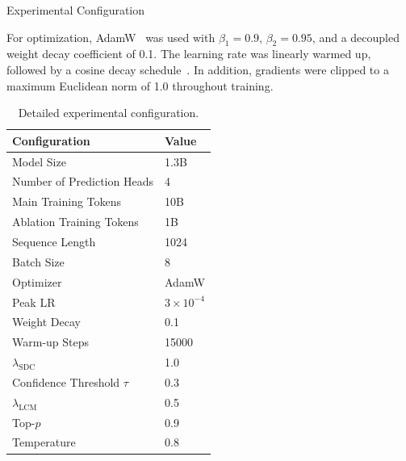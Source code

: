 
\begin{Appx}{Experimental Configuration}\label{app:experimental-config}

For optimization, AdamW~\cite{loshchilov2019adamw} was used with
$\beta_1=0.9$, $\beta_2=0.95$, and a decoupled weight decay coefficient
of 0.1. The learning rate was linearly warmed up, followed by a cosine
decay schedule~\cite{loshchilov2017sgdr}. In addition, gradients were
clipped to a maximum Euclidean norm of 1.0 throughout training.

\begin{table}[htbp]
    \centering
    \caption{Detailed experimental configuration.}
    \label{tab:experimental-config}

    \begin{tabular}{ll}
        \hline
        \textbf{Configuration} & \textbf{Value} \\
        \hline
        Model Size & 1.3B \\
        Number of Prediction Heads & 4 \\
        Main Training Tokens & 10B \\
        Ablation Training Tokens & 1B \\
        Sequence Length & 1024 \\
        Batch Size & 8 \\
        Optimizer & AdamW \\
        Peak LR & $3 \times 10^{-4}$ \\
        Weight Decay & 0.1 \\
        Warm-up Steps & 15000 \\
        $\lambda_{\mathrm{SDC}}$ & 1.0 \\
        Confidence Threshold $\tau$ & 0.3 \\
        $\lambda_{\mathrm{LCM}}$ & 0.5 \\
        Top-$p$ & 0.9 \\
        Temperature & 0.8 \\
        \hline
    \end{tabular}
\end{table}

\end{Appx}